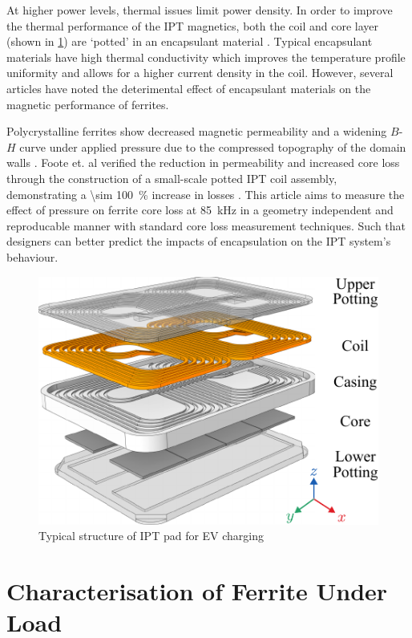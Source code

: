 \documentclass[conference]{IEEEtran}
\begin{document}
At higher power levels, thermal issues limit power density. 
In order to improve the thermal performance of the IPT magnetics, both the coil and core layer (shown in \cref{fig:padstructure}) are `potted' in an encapsulant material \cite{kneidlProcessingInfluencesResinbased2020}. 
Typical encapsulant materials have high thermal conductivity which improves the temperature profile uniformity and allows for a higher current density in the coil. 
However, several articles have noted the deterimental effect of encapsulant materials on the magnetic performance of ferrites. 

Polycrystalline ferrites show decreased magnetic permeability and a widening $B$-$H$ curve under applied pressure due to the compressed topography of the domain walls \cite{leflochEffectPressureSoft1981}. 
Foote et. al verified the reduction in permeability and increased core loss through the construction of a small-scale potted IPT coil assembly, demonstrating a \SI{\sim 100}{\percent} increase in losses \cite{footeEncapsulationResidualStress2023}.
This article aims to measure the effect of pressure on ferrite core loss at \SI{85}{\kilo\hertz} in a geometry independent and reproducable manner with standard core loss measurement techniques. Such that designers can better predict the impacts of encapsulation on the IPT system's behaviour. 

\begin{figure}[t]
  \centering
  \includegraphics{figures/padstructure.pdf}
  \caption{Typical structure of IPT pad for EV charging}
  \label{fig:padstructure}
\end{figure}

\section{Characterisation of Ferrite Under Load}
\end{document}
